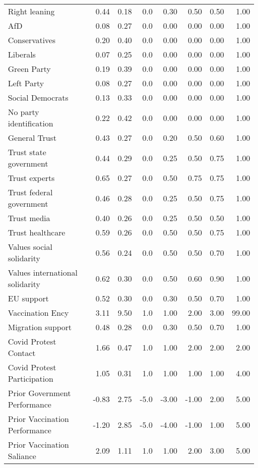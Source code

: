 \begin{table}
{\begin{tabular}[t]{lrrrrrrr}
Right leaning & 0.44 & 0.18 & 0.0 & 0.30 & 0.50 & 0.50 & 1.00\\
AfD & 0.08 & 0.27 & 0.0 & 0.00 & 0.00 & 0.00 & 1.00\\
Conservatives & 0.20 & 0.40 & 0.0 & 0.00 & 0.00 & 0.00 & 1.00\\
Liberals & 0.07 & 0.25 & 0.0 & 0.00 & 0.00 & 0.00 & 1.00\\
Green Party & 0.19 & 0.39 & 0.0 & 0.00 & 0.00 & 0.00 & 1.00\\
Left Party & 0.08 & 0.27 & 0.0 & 0.00 & 0.00 & 0.00 & 1.00\\
Social Democrats & 0.13 & 0.33 & 0.0 & 0.00 & 0.00 & 0.00 & 1.00\\
No party identification & 0.22 & 0.42 & 0.0 & 0.00 & 0.00 & 0.00 & 1.00\\
General Trust & 0.43 & 0.27 & 0.0 & 0.20 & 0.50 & 0.60 & 1.00\\
Trust state government & 0.44 & 0.29 & 0.0 & 0.25 & 0.50 & 0.75 & 1.00\\
Trust experts & 0.65 & 0.27 & 0.0 & 0.50 & 0.75 & 0.75 & 1.00\\
Trust federal government & 0.46 & 0.28 & 0.0 & 0.25 & 0.50 & 0.75 & 1.00\\
Trust media & 0.40 & 0.26 & 0.0 & 0.25 & 0.50 & 0.50 & 1.00\\
Trust healthcare & 0.59 & 0.26 & 0.0 & 0.50 & 0.50 & 0.75 & 1.00\\
Values social solidarity & 0.56 & 0.24 & 0.0 & 0.50 & 0.50 & 0.70 & 1.00\\
Values international solidarity & 0.62 & 0.30 & 0.0 & 0.50 & 0.60 & 0.90 & 1.00\\
EU support & 0.52 & 0.30 & 0.0 & 0.30 & 0.50 & 0.70 & 1.00\\
Vaccination Ency & 3.11 & 9.50 & 1.0 & 1.00 & 2.00 & 3.00 & 99.00\\
Migration support & 0.48 & 0.28 & 0.0 & 0.30 & 0.50 & 0.70 & 1.00\\
Covid Protest Contact & 1.66 & 0.47 & 1.0 & 1.00 & 2.00 & 2.00 & 2.00\\
Covid Protest Participation & 1.05 & 0.31 & 1.0 & 1.00 & 1.00 & 1.00 & 4.00\\
Prior Government Performance & -0.83 & 2.75 & -5.0 & -3.00 & -1.00 & 2.00 & 5.00\\
Prior Vaccination Performance & -1.20 & 2.85 & -5.0 & -4.00 & -1.00 & 1.00 & 5.00\\
Prior Vaccination Saliance & 2.09 & 1.11 & 1.0 & 1.00 & 2.00 & 3.00 & 5.00\\

\end{tabular}}
\end{table}
